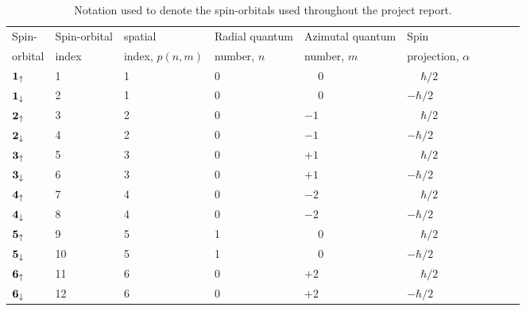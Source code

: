\documentclass[a4paper]{article}
\renewcommand{\u}[1]{{\bf #1}_\uparrow}
\renewcommand{\d}[1]{{\bf #1}_\downarrow}
\begin{document}
\newcommand{\ra}[1]{\renewcommand{\arraystretch}{#1}}
\begin{table*}\centering
\begin{tabular}{@{}llllllllll@{}}\toprule
Spin-         & Spin-orbital        & spatial         & Radial quantum    & Azimutal quantum    & Spin                       \\
orbital       & index               & index, $p(n,m)$ & number, $n$       & number, $m$         & projection, $\alpha$       \\
\midrule
$\u{1}$       & 1                   & 1               & 0                 & $\phantom{-}0$      & $\phantom{-}\hbar/2$                        \\
$\d{1}$       & 2                   & 1               & 0                 & $\phantom{-}0$      & $-\hbar/2$                        \\
$\u{2}$       & 3                   & 2               & 0                 & $-1$                & $\phantom{-}\hbar/2$                        \\
$\d{2}$       & 4                   & 2               & 0                 & $-1$                & $-\hbar/2$                        \\
$\u{3}$       & 5                   & 3               & 0                 & $+1$                & $\phantom{-}\hbar/2$                        \\
$\d{3}$       & 6                   & 3               & 0                 & $+1$                & $-\hbar/2$                        \\
$\u{4}$       & 7                   & 4               & 0                 & $-2$                & $\phantom{-}\hbar/2$                        \\
$\d{4}$       & 8                   & 4               & 0                 & $-2$                & $-\hbar/2$                        \\
$\u{5}$       & 9                   & 5               & 1                 & $\phantom{-}0$      & $\phantom{-}\hbar/2$                        \\
$\d{5}$       & 10                  & 5               & 1                 & $\phantom{-}0$      & $-\hbar/2$                        \\
$\u{6}$       & 11                  & 6               & 0                 & $+2$                & $\phantom{-}\hbar/2$                        \\
$\d{6}$       & 12                  & 6               & 0                 & $+2$                & $-\hbar/2$                        \\
\bottomrule
\end{tabular}
\caption{Notation used to denote the spin-orbitals used throughout the project report.\label{tab:1}}
\end{table*}
\end{document}
